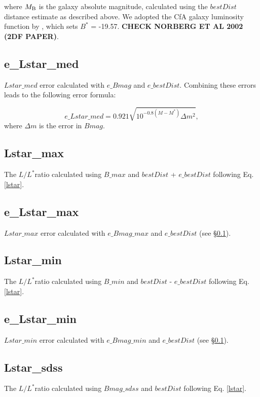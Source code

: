 \documentclass[twocolumn,tighten]{aastex62}
\newcommand{\Lstar}{$L^*$}
\begin{document}
\noindent where $M_{\rm B}$ is the galaxy absolute magnitude, calculated using the $bestDist$ distance estimate as described above. We adopted the CfA galaxy luminosity function by \citep{marzke1994}, which sets $B^{*} $ = -19.57. \textbf{CHECK NORBERG ET AL 2002 (2DF PAPER)}.


\subsection{e\_Lstar\_med} \label{e_Lstar_med}
$Lstar\_med$ error calculated with $e\_Bmag$ and $e\_bestDist$. Combining these errors leads to the following error formula:

\begin{equation}
	e\_Lstar\_med = 0.921 \sqrt{10^{-0.8(M - M^*)}  \Delta m^2},
\end{equation}
\noindent where $\Delta m$ is the error in $Bmag$.



\subsection{Lstar\_max}
The $L / $\Lstar  ratio calculated using $B\_max$ and $bestDist$ + $e\_bestDist$ following Eq. \ref{lstar}. \\


\subsection{e\_Lstar\_max}
$Lstar\_max$ error calculated with $e\_Bmag\_max$ and $e\_bestDist$ (see \S \ref{e_Lstar_med}).


\subsection{Lstar\_min}
The $L / $\Lstar ratio calculated using $B\_min$ and $bestDist$ - $e\_bestDist$ following Eq. \ref{lstar}.


\subsection{e\_Lstar\_min}
$Lstar\_min$ error calculated with $e\_Bmag\_min$ and $e\_bestDist$ (see \S \ref{e_Lstar_med}).


\subsection{Lstar\_sdss}
The $L / $\Lstar ratio calculated using $Bmag\_sdss$ and $bestDist$ following Eq. \ref{lstar}.
\end{document}

